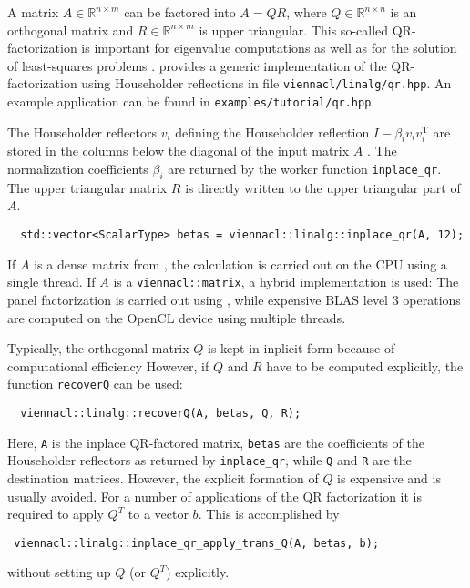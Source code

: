 A matrix $A \in \mathbb{R}^{n\times m}$ can be factored into $A = Q R$, where $Q \in \mathbb{R}^{n\times n}$ is an
orthogonal matrix and $R \in \mathbb{R}^{n \times m}$ is upper triangular. This so-called QR-factorization is important for eigenvalue computations as well as
for the solution of least-squares problems \cite{golub:matrix-computations}. {\ViennaCL} provides a generic implementation of the QR-factorization using
Householder reflections in file \lstinline|viennacl/linalg/qr.hpp|. An example application can be found in \lstinline|examples/tutorial/qr.hpp|.

The Householder reflectors $v_i$ defining the Householder reflection $I - \beta_i v_i v_i^{\mathrm{T}}$ are stored in the
columns below the diagonal of the input matrix $A$ \cite{golub:matrix-computations}. The normalization coefficients $\beta_i$ are returned by the
worker function \lstinline|inplace_qr|. The upper triangular matrix $R$ is directly written to the upper triangular part of $A$. 
\begin{lstlisting}
  std::vector<ScalarType> betas = viennacl::linalg::inplace_qr(A, 12);
\end{lstlisting}
If $A$ is a dense matrix from \ublas, the calculation is carried out on the CPU using a single thread. If $A$ is a 
\lstinline|viennacl::matrix|, a hybrid implementation is used: The panel factorization is carried out using \ublas, while expensive BLAS level 3 operations
are computed on the OpenCL device using multiple threads. 

Typically, the orthogonal matrix $Q$ is kept in inplicit form because of computational efficiency
However, if $Q$ and $R$ have to be computed explicitly, the function \lstinline|recoverQ| can be used:
\begin{lstlisting}
  viennacl::linalg::recoverQ(A, betas, Q, R); 
\end{lstlisting}
Here, \lstinline|A| is the inplace QR-factored matrix, \lstinline|betas| are the coefficients of the Householder reflectors as returned by
\lstinline|inplace_qr|, while \lstinline|Q| and \lstinline|R| are the destination matrices. However, the explicit formation of $Q$ is expensive and is usually avoided.
For a number of applications of the QR factorization it is required to apply $Q^T$ to a vector $b$. This is accomplished by
\begin{lstlisting}
 viennacl::linalg::inplace_qr_apply_trans_Q(A, betas, b);
\end{lstlisting}
without setting up $Q$ (or $Q^T$) explicitly.

